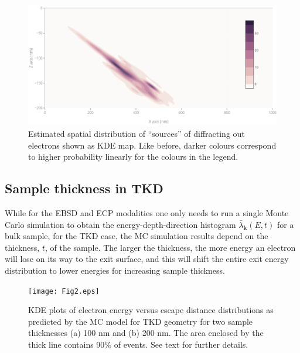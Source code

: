 \begin{figure}[ht]
\centering
\includegraphics[width=1.\linewidth]{Figures/last_weight.png}
\caption[Estimated spatial distribution of diffraction out ``sources''.]{Estimated spatial distribution of ``sources'' of diffracting out electrons shown as KDE map. Like before, darker colours correspond to higher probability linearly for the colours in the legend.  }
\label{fig:last_weight}
\end{figure}




%
\subsection{Sample thickness in TKD}
\label{sec:TKDthickness}
While for the EBSD and ECP modalities one only needs to run a single Monte Carlo simulation to obtain the energy-depth-direction histogram $\bar{\lambda}_{\mathbf{k}}(E,t)$ for a bulk sample, for the TKD case, the MC simulation results depend on the thickness, $t$, of the sample.
The larger the thickness, the more energy an electron will lose on its way to the exit surface, and this will shift the entire exit energy distribution to lower energies for increasing sample thickness. 




\begin{figure}[ht]
\centering
\texttt{[image: Fig2.eps]}%
\caption[KDE plots of electron energy versus escape distance distributions]{KDE plots of electron energy versus escape distance distributions as predicted by the MC model for TKD geometry for two sample thicknesses (a) 100 nm and (b) 200 nm. The area enclosed by the thick line contains 90$\%$ of events. See text for further details. }
\label{fig:E_z_KDE}
\end{figure}

